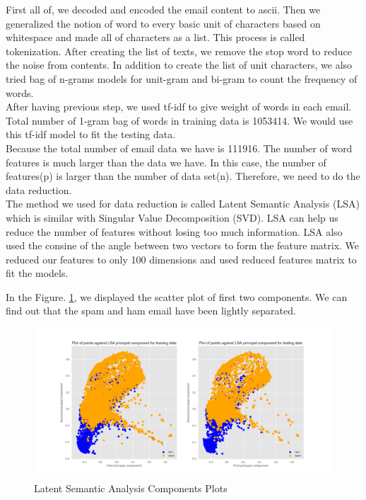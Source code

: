 First all of, we decoded and encoded the email content to ascii. Then we generalized the notion of word to every basic unit of characters based on whitespace and made all of characters as a list. This process is called tokenization. After creating the list of texts, we remove the stop word to reduce the noise from contents. In addition to create the list of unit characters, we also tried bag of n-grams models for unit-gram and bi-gram to count the frequency of words.\\

After having previous step, we used tf-idf to give weight of words in each email. Total number of 1-gram bag of words in training data is 1053414. We would use this tf-idf model to fit the testing data.\\ Because the total number of email data we have is 111916. The number of word features is much larger than the data we have. In this case, the number of features(p) is larger than the number of data set(n). Therefore, we need to do the data reduction.\\

The method we used for data reduction is called Latent Semantic Analysis (LSA) which is similar with Singular Value Decomposition (SVD). LSA can help us reduce the number of features without losing too much information. LSA also used the consine of the angle between two vectors to form the feature matrix. We reduced our features to only 100 dimensions and used reduced features matrix to fit the models.

In the Figure. \ref{FE}, we displayed the scatter plot of first two components. We can find out that the spam and ham email have been lightly separated.

\begin{figure}[H]
    \centering
    \includegraphics[scale=0.4]{data_reduction_cp12.png}
    \caption{Latent Semantic Analysis Components Plots}
    \label{FE}
\end{figure}


